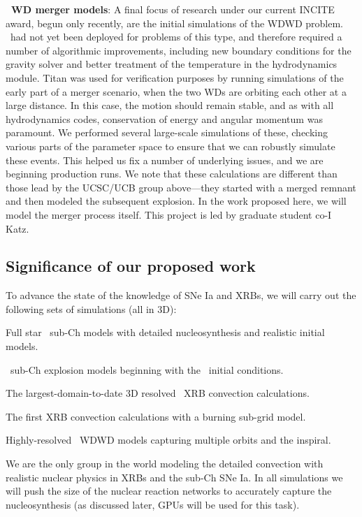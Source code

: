 \documentclass[11pt,letterpaper,english]{article}
\begin{document}
{\bf \castro\ WD merger models}:
%
A final focus of research under our current INCITE award, begun only
recently, are the initial simulations of the WDWD problem.  \castro\ had not yet been deployed for problems of this type,
and therefore required a number of algorithmic
improvements, including new boundary conditions for the gravity solver
and better treatment of the temperature in the hydrodynamics module.
Titan was used for verification purposes by running simulations of the
early part of a merger scenario, when the two WDs are orbiting each
other at a large distance. In this case, the motion should remain
stable, and as with all hydrodynamics codes, conservation of energy
and angular momentum was paramount. We performed several large-scale
simulations of these, checking various parts of the parameter space to
ensure that we can robustly simulate these events. This helped us fix
a number of underlying issues, and we are beginning production runs.
We note that these calculations are different than those lead by the
UCSC/UCB group above---they started with a merged remnant and then
modeled the subsequent explosion.  In the work proposed here, we 
will model the merger process itself.  This project is led by graduate
student co-I Katz.


\subsection{Significance of our proposed work}

To advance the state of the knowledge of SNe Ia and XRBs, we will
carry out the following sets of simulations (all in 3D):
\begin{tightitem}
\item Full star \maestro\ sub-Ch models with 
  detailed nucleosynthesis and realistic initial models.
\item \castro\ sub-Ch explosion models beginning with the
  \maestro\ initial conditions.
\item The largest-domain-to-date 3D resolved \maestro\ XRB convection
  calculations.
\item The first XRB convection calculations with a burning sub-grid
  model.
\item Highly-resolved \castro\ WDWD models capturing multiple orbits
  and the inspiral.
\end{tightitem}

We are the only group in the world modeling the detailed convection
with realistic nuclear physics in XRBs and the sub-Ch SNe Ia.
In all simulations we will push the size of the nuclear reaction networks
to accurately capture the nucleosynthesis (as discussed later, GPUs will
be used for this task).
\end{document}
